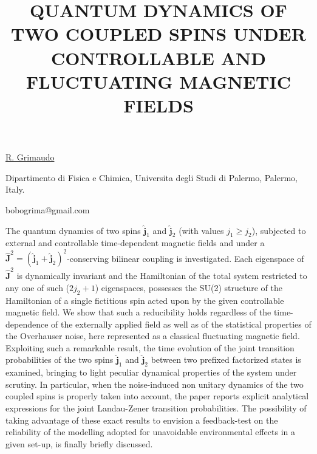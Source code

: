 \title{QUANTUM DYNAMICS OF TWO COUPLED SPINS UNDER CONTROLLABLE AND FLUCTUATING MAGNETIC FIELDS}

\underline{R. Grimaudo} 

{\normalsize{\vspace{-4mm}
Dipartimento di Fisica e Chimica, Universita degli Studi di Palermo, Palermo, Italy.

\email bobogrima@gmail.com}}

The quantum dynamics of two spins $\hat{\mathbf{j}}_1$ and $\hat{\mathbf{j}}_2$ (with values $j_1\geq j_2$), subjected to external and controllable time-dependent magnetic fields and under a $\hat{\mathbf{J}}^2=(\hat{\mathbf{j}}_1+\hat{\mathbf{j}}_2)^2$-conserving bilinear coupling is investigated.
Each eigenspace of $\hat{\mathbf{J}}^2$ is dynamically invariant and the Hamiltonian of the total system restricted to any one of such ($2j_2+1$) eigenspaces, possesses the SU(2) structure of the Hamiltonian of a single fictitious spin acted upon by the given controllable magnetic field.
We show that such a reducibility holds regardless of the time-dependence of the externally applied field as well as of the statistical properties of the Overhauser noise, here represented as a classical fluctuating magnetic field.
Exploiting such a remarkable result, the time evolution of the joint transition probabilities of the two spins $\hat{\mathbf{j}}_1$ and $\hat{\mathbf{j}}_2$ between two prefixed factorized states is examined, bringing to light peculiar dynamical properties of the system under scrutiny.
In particular, when the noise-induced non unitary dynamics of the two coupled spins is properly taken into account, the paper reports explicit analytical expressions for the joint Landau-Zener transition probabilities.
The possibility of taking advantage of these exact results to envision a feedback-test on the reliability of the modelling adopted for unavoidable environmental effects in a given set-up, is finally briefly discussed.

\vspace{\baselineskip} 